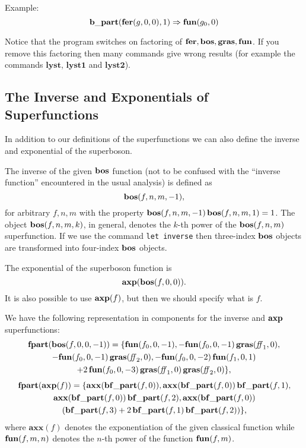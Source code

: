 {\begin{enumerate}
  Example:
  \begin{equation*}
    \mathbf{b\_part}(\mathbf{fer}(g,0,0),1) \Rightarrow \mathbf{fun}(g_{0},0)
  \end{equation*}
\end{enumerate}

Notice that the program switches on factoring of
$\mathbf{fer},\mathbf{bos},\mathbf{gras},\mathbf{fun}$.  If you remove this factoring then many
commands give wrong results (for example the commands $\mathbf{lyst}$,
$\mathbf{lyst1}$ and $\mathbf{lyst2}$).

\subsection{The Inverse and Exponentials of Superfunctions}

In addition to our definitions of the superfunctions we can also
define the inverse and exponential of the superboson.

The inverse of the given $\mathbf{bos}$ function (not to be confused with the
``inverse function'' encountered in the usual analysis) is defined as
\begin{equation*}
  \mathbf{bos}(f,n,m,-1),
\end{equation*}
for arbitrary $f,n,m$ with the property
$\mathbf{bos}(f,n,m,-1)\,\mathbf{bos}(f,n,m,1)=1$.  The object $\mathbf{bos}(f,n,m,k)$, in
general, denotes the $k$-th power of the $\mathbf{bos}(f,n,m)$ superfunction.
If we use the command \texttt{let inverse} then three-index $\mathbf{bos}$
objects are transformed into four-index $\mathbf{bos}$ objects.

The exponential of the superboson function is
\begin{equation*}
  \mathbf{axp}(\mathbf{bos}(f,0,0)).
\end{equation*}
It is also possible to use $\mathbf{axp}(f)$, but then we should specify what
is $f$.

We have the following representation in components for the inverse and
$\mathbf{axp}$ superfunctions:
\begin{multline*}
  \mathbf{fpart}(\mathbf{bos}(f,0,0,-1)) = \{ \mathbf{fun}(f_{0},0,-1), -\mathbf{fun}(f_{0},0,-1)\,\mathbf{gras}(\mathit{ff}_{1},0), \\
  -\mathbf{fun}(f_{0},0,-1)\,\mathbf{gras}(\mathit{ff}_{2},0), - \mathbf{fun}(f_{0},0,-2)\,\mathbf{fun}(f_{1},0,1) \\
  + 2\,\mathbf{fun}(f_{0},0,-3)\,\mathbf{gras}(\mathit{ff}_{1},0)\,\mathbf{gras}(\mathit{ff}_{2},0) \},
\end{multline*}
\begin{multline*}
  \mathbf{fpart}(\mathbf{axp}(f)) = \{ \mathbf{axx}(\mathbf{bf\_part}(f,0)),
  \mathbf{axx}(\mathbf{bf\_part}(f,0))\,\mathbf{bf\_part}(f,1), \\
  \mathbf{axx}(\mathbf{bf\_part}(f,0))\,\mathbf{bf\_part}(f,2), \mathbf{axx}(\mathbf{bf\_part}(f,0)) \\
  (\mathbf{bf\_part}(f,3)+2\,\mathbf{bf\_part}(f,1)\,\mathbf{bf\_part}(f,2)) \},
\end{multline*}
where $\mathbf{axx}(f)$ denotes the exponentiation of the given
classical function while $\mathbf{fun}(f,m,n)$ denotes the $n$-th power of the
function $\mathbf{fun}(f,m)$.

}
